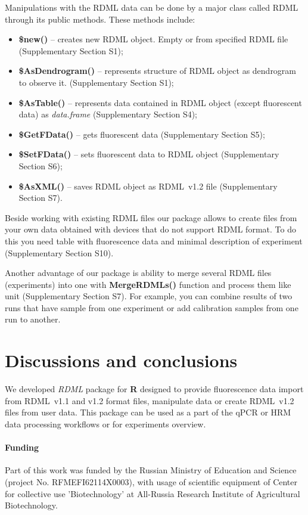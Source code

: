 \documentclass{bioinfo}
\begin{document}
	Manipulations with the RDML data can be done by a major class called RDML
	through
	its public methods. These methods include: \begin{itemize} \item
		\textbf{\$new()} -- creates new RDML object. Empty or from specified RDML file
		(Supplementary Section S1); \item \textbf{\$AsDendrogram()} -- represents
		structure of RDML object as dendrogram to observe it. (Supplementary Section
		S1); \item \textbf{\$AsTable()} -- represents data contained in RDML object
		(except fluorescent data) as \textit{data.frame} (Supplementary Section S4);
		\item \textbf{\$GetFData()} -- gets fluorescent data (Supplementary Section S5);
		\item \textbf{\$SetFData()} -- sets fluorescent data to RDML object
		(Supplementary Section S6); \item \textbf{\$AsXML()} -- saves RDML object as
		RDML~v1.2 file (Supplementary Section S7). \end{itemize}
	
	Beside working with existing RDML files our package allows to create files from
	your own data obtained with devices that do not support RDML format. To do this
	you need table with fluorescence data and minimal description of experiment
	(Supplementary Section S10).
	
	Another advantage of our package is ability to merge several RDML files
	(experiments) into one with \textbf{MergeRDMLs()} function and process them like
	unit (Supplementary Section S7). For example, you can combine results of two
	runs that have sample from one experiment or add calibration samples from one
	run to another.
	
	\section{Discussions and conclusions}
	
	We developed \textit{RDML} package for \textbf{R} designed to provide
	fluorescence data import from RDML~v1.1 and v1.2 format files, manipulate data
	or create RDML~v1.2 files from user data. This package can be used as a part of
	the qPCR or HRM data processing workflows or for experiments overview.
	
	\paragraph{Funding\textcolon}  Part of this work was funded by the Russian
	Ministry of Education and Science (project No. RFMEFI62114X0003), with usage of
	scientific equipment of Center for collective use ’Biotechnology’ at All-Russia
	Research Institute of Agricultural Biotechnology.
	
	
	
\end{document}
